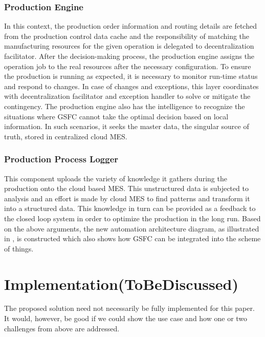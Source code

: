 \documentclass[10pt,conference,compsocconf]{IEEEtran}
\begin{document}
\subsubsection{Production Engine}
In this context, the production order information and routing details are fetched from the production control data cache and the responsibility of matching the manufacturing resources for the given operation is delegated to decentralization facilitator. After the decision-making process, the production engine assigns the operation job to the real resources after the necessary configuration. To ensure the production is running as expected, it is necessary to monitor run-time status and respond to changes. In case of changes and exceptions, this layer coordinates with decentralization facilitator and exception handler to solve or mitigate the contingency. The production engine also has the intelligence to recognize the situations where GSFC cannot take the optimal decision based on local information. In such scenarios, it seeks the master data, the singular source of truth, stored in centralized cloud MES.

\subsubsection{Production Process Logger}
This component uploads the variety of knowledge it gathers during the production onto the cloud based MES. This unstructured data is subjected to analysis and an effort is made by cloud MES to find patterns and transform it into a structured data. This knowledge in turn can be provided as a feedback to the closed loop system in order to optimize the production in the long run.
Based on the above arguments, the new automation architecture diagram, as illustrated in , is constructed which also shows how GSFC can be integrated into the scheme of things.
\section{Implementation(ToBeDiscussed)}
The proposed solution need not necessarily be fully implemented for this paper. It would, however, be good if we could show the use case and how one or two challenges from above are addressed.
\end{document}
